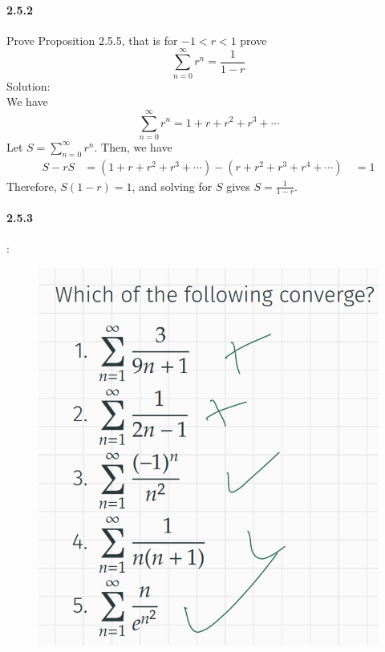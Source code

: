 \documentclass{article}
\begin{document}
\paragraph{2.5.2}
Prove Proposition 2.5.5, that is for $-1<r<1$ prove 
$$\sum_{n=0}^{\infty}r^n=\frac{1}{1-r}$$
Solution:\\
We have
$$\sum_{n=0}^{\infty}r^n=1+r+r^2+r^3+\cdots$$
Let $S=\sum_{n=0}^{\infty}r^n$. Then, we have
\begin{align*}
S-rS &= (1+r+r^2+r^3+\cdots)-(r+r^2+r^3+r^4+\cdots) \
&= 1
\end{align*}
Therefore, $S(1-r)=1$, and solving for $S$ gives $S=\frac{1}{1-r}$.
\paragraph{2.5.3}:\\
\begin{figure}[H]
    \centering
    \includegraphics{0149}
\end{figure}
\end{document}
